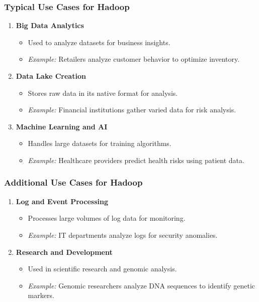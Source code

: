 \documentclass[aspectratio=169]{beamer}
\begin{document}
\begin{frame}[fragile]
    \frametitle{Typical Use Cases for Hadoop}
    \begin{enumerate}
        \item \textbf{Big Data Analytics}
            \begin{itemize}
                \item Used to analyze datasets for business insights.
                \item \textit{Example:} Retailers analyze customer behavior to optimize inventory.
            \end{itemize}
        
        \item \textbf{Data Lake Creation}
            \begin{itemize}
                \item Stores raw data in its native format for analysis.
                \item \textit{Example:} Financial institutions gather varied data for risk analysis.
            \end{itemize}
        
        \item \textbf{Machine Learning and AI}
            \begin{itemize}
                \item Handles large datasets for training algorithms.
                \item \textit{Example:} Healthcare providers predict health risks using patient data.
            \end{itemize}
    \end{enumerate}
\end{frame}

\begin{frame}[fragile]
    \frametitle{Additional Use Cases for Hadoop}
    \begin{enumerate}[resume]
        \item \textbf{Log and Event Processing}
            \begin{itemize}
                \item Processes large volumes of log data for monitoring.
                \item \textit{Example:} IT departments analyze logs for security anomalies.
            \end{itemize}

        \item \textbf{Research and Development}
            \begin{itemize}
                \item Used in scientific research and genomic analysis.
                \item \textit{Example:} Genomic researchers analyze DNA sequences to identify genetic markers.
            \end{itemize}
    \end{enumerate}
\end{frame}
\end{document}
